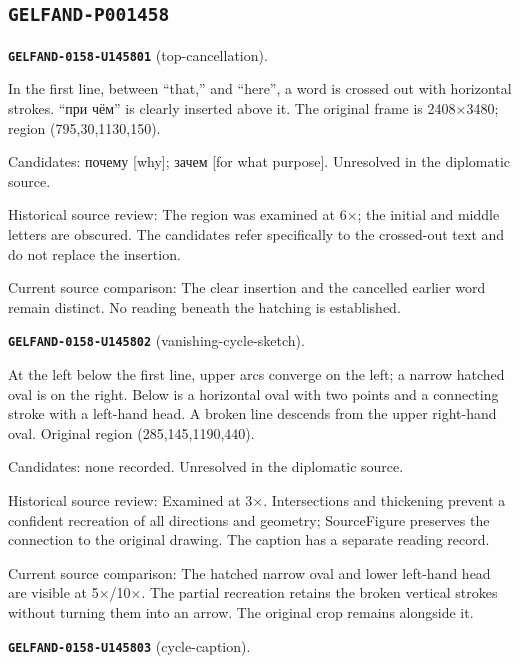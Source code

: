 \subsection*{\texttt{GELFAND-P001458}}
\par\noindent\leavevmode{}\label{GELFAND-0158-U145801}\label{GELFAND-P001458:top-cancellation}\textbf{\texttt{GELFAND-0158-U145801}} (top-cancellation).\nopagebreak[4]\par
In the first line, between “that,” and “here”, a word is crossed out with horizontal strokes. “при чём” is clearly inserted above it. The original frame is 2408×3480; region (795,30,1130,150).\par
Candidates: почему [why]; зачем [for what purpose]. Unresolved in the diplomatic source.\par
Historical source review: The region was examined at 6×; the initial and middle letters are obscured. The candidates refer specifically to the crossed-out text and do not replace the insertion.\par
Current source comparison: The clear insertion and the cancelled earlier word remain distinct. No reading beneath the hatching is established.\par\medskip
\par\noindent\leavevmode{}\label{GELFAND-0158-U145802}\label{GELFAND-P001458:vanishing-cycle-sketch}\textbf{\texttt{GELFAND-0158-U145802}} (vanishing-cycle-sketch).\nopagebreak[4]\par
At the left below the first line, upper arcs converge on the left; a narrow hatched oval is on the right. Below is a horizontal oval with two points and a connecting stroke with a left-hand head. A broken line descends from the upper right-hand oval. Original region (285,145,1190,440).\par
Candidates: none recorded. Unresolved in the diplomatic source.\par
Historical source review: Examined at 3×. Intersections and thickening prevent a confident recreation of all directions and geometry; SourceFigure preserves the connection to the original drawing. The caption has a separate reading record.\par
Current source comparison: The hatched narrow oval and lower left-hand head are visible at 5×/10×. The partial recreation retains the broken vertical strokes without turning them into an arrow. The original crop remains alongside it.\par\medskip
\par\noindent\leavevmode{}\label{GELFAND-0158-U145803}\label{GELFAND-P001458:cycle-caption}\textbf{\texttt{GELFAND-0158-U145803}} (cycle-caption).\nopagebreak[4]\par
